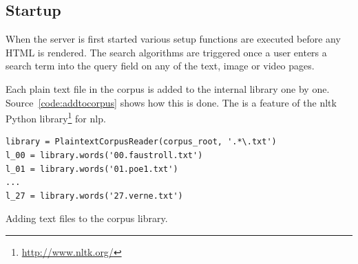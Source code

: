 

\subsection{Startup}
\label{s:index}

When the server is first started various setup functions are executed before any HTML is rendered. The search algorithms are triggered once a user enters a search term into the query field on any of the text, image or video pages.

Each plain text file in the corpus is added to the internal library one by one. Source~\ref{code:addtocorpus} shows how this is done. The  is a feature of the \gls{nltk} Python library\footnote{\url{http://www.nltk.org/}} for \acrlong{nlp}.

\begin{listing}
  \begin{verbatim}
library = PlaintextCorpusReader(corpus_root, '.*\.txt')
l_00 = library.words('00.faustroll.txt')
l_01 = library.words('01.poe1.txt')
...
l_27 = library.words('27.verne.txt')
  \end{verbatim}
\caption{Adding text files to the corpus library.}
\label{code:addtocorpus}
\end{listing}

